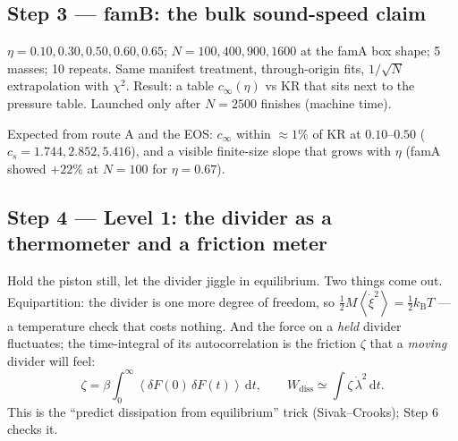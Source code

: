 \documentclass[11pt,a4paper]{article}
\newcommand{\kT}{k_{\mathrm B}T}
\newcommand{\avg}[1]{\left\langle #1 \right\rangle}
\newcommand{\dd}{\mathrm{d}}
\begin{document}
\subsection{Step 3 --- famB: the bulk sound-speed claim}
\begin{eli}
$\eta = 0.10, 0.30, 0.50, 0.60, 0.65$; $N = 100, 400, 900, 1600$ at the famA box shape; 5 masses; 10 repeats. Same manifest treatment, through-origin fits, $1/\sqrt N$ extrapolation with $\chi^2$. Result: a table $c_\infty(\eta)$ vs KR that sits next to the pressure table. Launched only after $N = 2500$ finishes (machine time).
\end{eli}
\begin{num}
Expected from route A and the EOS: $c_\infty$ within $\approx1\%$ of KR at $0.10$--$0.50$ ($c_s = 1.744, 2.852, 5.416$), and a visible finite-size slope that grows with $\eta$ (famA showed $+22\%$ at $N=100$ for $\eta = 0.67$).
\end{num}

\subsection{Step 4 --- Level 1: the divider as a thermometer and a friction meter}
\begin{eli}
Hold the piston still, let the divider jiggle in equilibrium. Two things come out. Equipartition: the divider is one more degree of freedom, so $\tfrac12M\avg{\dot\xi^2} = \tfrac12\kT$ --- a temperature check that costs nothing. And the force on a \emph{held} divider fluctuates; the time-integral of its autocorrelation is the friction $\zeta$ that a \emph{moving} divider will feel:
\begin{equation}
\zeta = \beta\int_0^\infty\avg{\delta F(0)\,\delta F(t)}\,\dd t,\qquad
W_{\mathrm{diss}} \simeq \int\zeta\,\dot\lambda^2\,\dd t .
\end{equation}
This is the ``predict dissipation from equilibrium'' trick (Sivak--Crooks); Step 6 checks it.
\end{eli}
\end{document}
